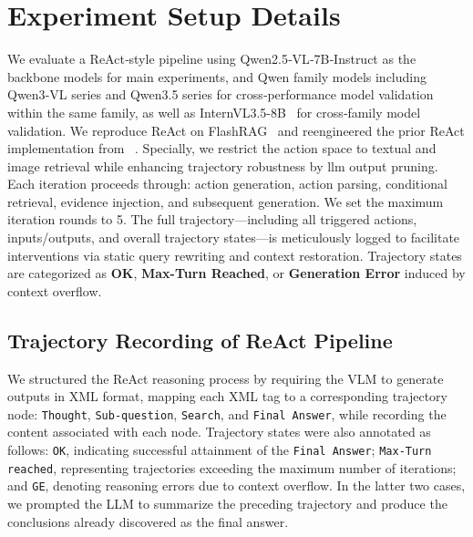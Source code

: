 \documentclass{article} %
\begin{document}
\section{Experiment Setup Details}\label{app:experiment_setup_details}
We evaluate a ReAct‑style pipeline using Qwen2.5‑VL‑7B‑Instruct as the backbone models for main experiments, and Qwen family models including Qwen3‑VL series and Qwen3.5 series for cross‑performance model validation within the same family, as well as InternVL3.5-8B~\citep{wang2025internvl3_5} for cross‑family model validation. We reproduce ReAct on FlashRAG~\citep{jin2025flashrag} and reengineered the prior ReAct implementation from ~\citep{li2024benchmarking}. Specially, we restrict the action space to textual and image retrieval while enhancing trajectory robustness by llm output pruning. Each iteration proceeds through: action generation, action parsing, conditional retrieval, evidence injection, and subsequent generation. We set the maximum iteration rounds to 5. The full trajectory—including all triggered actions, inputs/outputs, and overall trajectory states—is meticulously logged to facilitate interventions via static query rewriting and context restoration. Trajectory states are categorized as \textbf{OK}, \textbf{Max-Turn Reached}, or \textbf{Generation Error} induced by context overflow.

\subsection{Trajectory Recording of ReAct Pipeline}
We structured the ReAct reasoning process by requiring the VLM to generate outputs in XML format, mapping each XML tag to a corresponding trajectory node: \texttt{Thought}, \texttt{Sub-question}, \texttt{Search}, and \texttt{Final Answer}, while recording the content associated with each node. Trajectory states were also annotated as follows: \texttt{OK}, indicating successful attainment of the \texttt{Final Answer}; \texttt{Max-Turn reached}, representing trajectories exceeding the maximum number of iterations; and \texttt{GE}, denoting reasoning errors due to context overflow. In the latter two cases, we prompted the LLM to summarize the preceding trajectory and produce the conclusions already discovered as the final answer.
\end{document}

